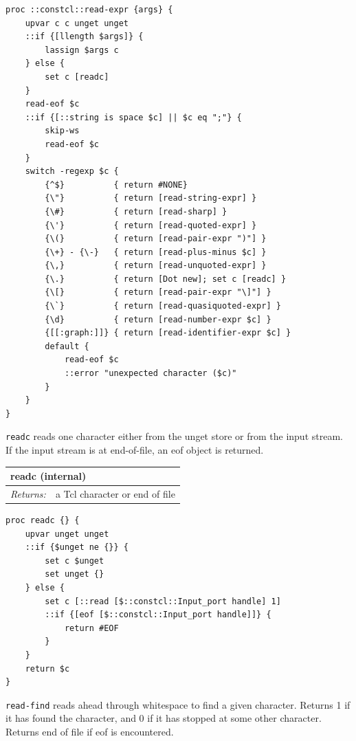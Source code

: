 \documentclass[twoside,9pt]{report}
\begin{document}
\noindent\makebox[\linewidth]{\rule{\linewidth}{0.4pt}}
\begin{lstlisting}
proc ::constcl::read-expr {args} {
    upvar c c unget unget
    ::if {[llength $args]} {
        lassign $args c
    } else {
        set c [readc]
    }
    read-eof $c
    ::if {[::string is space $c] || $c eq ";"} {
        skip-ws
        read-eof $c
    }
    switch -regexp $c {
        {^$}          { return #NONE}
        {\"}          { return [read-string-expr] }
        {\#}          { return [read-sharp] }
        {\'}          { return [read-quoted-expr] }
        {\(}          { return [read-pair-expr ")"] }
        {\+} - {\-}   { return [read-plus-minus $c] }
        {\,}          { return [read-unquoted-expr] }
        {\.}          { return [Dot new]; set c [readc] }
        {\[}          { return [read-pair-expr "\]"] }
        {\`}          { return [read-quasiquoted-expr] }
        {\d}          { return [read-number-expr $c] }
        {[[:graph:]]} { return [read-identifier-expr $c] }
        default {
            read-eof $c
            ::error "unexpected character ($c)"
        }
    }
}
\end{lstlisting}
\noindent\makebox[\linewidth]{\rule{\linewidth}{0.4pt}}

\texttt{readc} reads one character either from the unget store or from the input stream. If the input stream is at end-of-file, an eof object is returned.

\begin{tabular}{ |l l| }
\hline
\multicolumn{2}{|l|}{readc (internal)} \\
\hline
\textit{Returns:} & a Tcl character or end of file \\
\hline
\end{tabular}

\noindent\makebox[\linewidth]{\rule{\linewidth}{0.4pt}}
\begin{lstlisting}
proc readc {} {
    upvar unget unget
    ::if {$unget ne {}} {
        set c $unget
        set unget {}
    } else {
        set c [::read [$::constcl::Input_port handle] 1]
        ::if {[eof [$::constcl::Input_port handle]]} {
            return #EOF
        }
    }
    return $c
}
\end{lstlisting}
\noindent\makebox[\linewidth]{\rule{\linewidth}{0.4pt}}

\texttt{read-find} reads ahead through whitespace to find a given character. Returns 1
if it has found the character, and 0 if it has stopped at some other character.
Returns end of file if eof is encountered.
\end{document}
